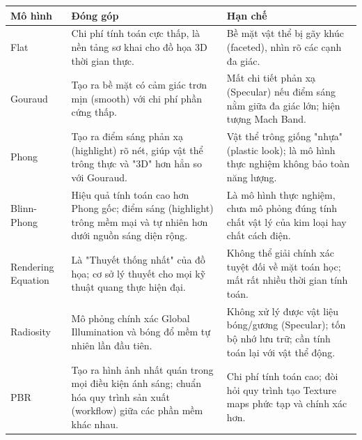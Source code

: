 \begin{table}[H]
	\centering
	\begin{tabular}{|l|p{6cm}|p{6cm}|}
		\hline
		\textbf{Mô hình} & \textbf{Đóng góp} & \textbf{Hạn chế} \\ \hline
		Flat & Chi phí tính toán cực thấp, là nền tảng sơ khai cho đồ họa 3D thời gian thực. & Bề mặt vật thể bị gãy khúc (faceted), nhìn rõ các cạnh đa giác. \\ \hline
		Gouraud & Tạo ra bề mặt có cảm giác trơn mịn (smooth) với chi phí phần cứng thấp. & Mất chi tiết phản xạ (Specular) nếu điểm sáng nằm giữa đa giác lớn; hiện tượng Mach Band. \\ \hline
		Phong & Tạo ra điểm sáng phản xạ (highlight) rõ nét, giúp vật thể trông thực và "3D" hơn hẳn so với Gouraud. & Vật thể trông giống "nhựa" (plastic look); là mô hình thực nghiệm không bảo toàn năng lượng. \\ \hline
		Blinn-Phong & Hiệu quả tính toán cao hơn Phong gốc; điểm sáng (highlight) trông mềm mại và tự nhiên hơn dưới nguồn sáng diện rộng. & Là mô hình thực nghiệm, chưa mô phỏng đúng tính chất vật lý của kim loại hay chất cách điện. \\ \hline
		Rendering Equation & Là "Thuyết thống nhất" của đồ họa; cơ sở lý thuyết cho mọi kỹ thuật quang thực hiện đại. & Không thể giải chính xác tuyệt đối về mặt toán học; mất rất nhiều thời gian tính toán. \\ \hline
		Radiosity & Mô phỏng chính xác Global Illumination và bóng đổ mềm tự nhiên lần đầu tiên. & Không xử lý được vật liệu bóng/gương (Specular); tốn bộ nhớ lưu trữ; cần tính toán lại với vật thể động. \\ \hline
		PBR & Tạo ra hình ảnh nhất quán trong mọi điều kiện ánh sáng; chuẩn hóa quy trình sản xuất (workflow) giữa các phần mềm khác nhau. & Chi phí tính toán cao; đòi hỏi quy trình tạo Texture maps phức tạp và chính xác hơn. \\ \hline
	\end{tabular}
\end{table}

